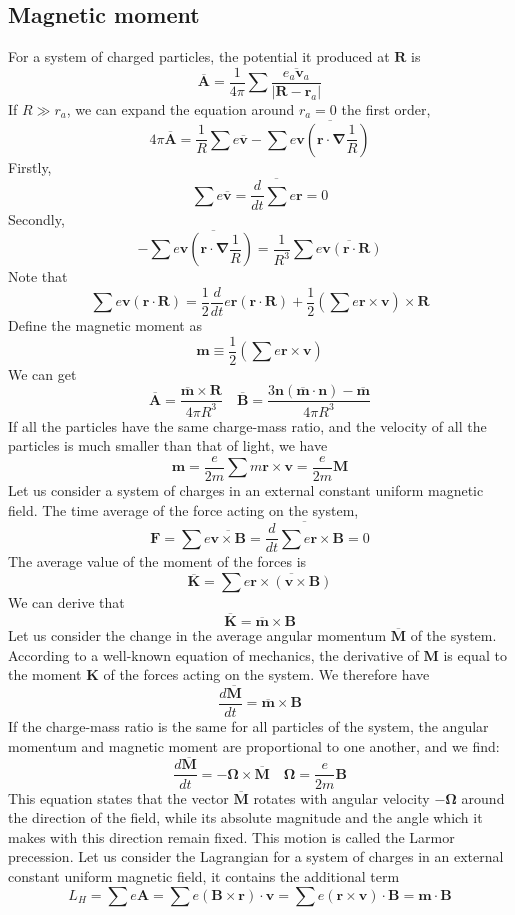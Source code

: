 \documentclass[cyan]{elegantnote}
\begin{document}
\subsection{Magnetic moment}
For a system of charged particles, the potential it produced at $\bm{R}$ is
\[\overline{\bm{A}} = \frac{1}{4\pi} \sum \overline{\frac{e_a \bm{v}_a}{|\bm{R}-\bm{r}_a|}}\]
If $R \gg r_a$, we can expand the equation around $r_a=0$ the first order,
\[4\pi \overline{\bm{A}} = \frac{1}{R} \sum e \overline{\bm{v}} - \sum \overline{e \bm{v} \left( \bm{r} \cdot \bm{\nabla} \frac{1}{R}\right)}\]
Firstly,
\[\sum e \overline{\bm{v}} = \overline{\frac{d}{dt} \sum e \bm{r}} = 0\]
Secondly,
\[-\sum \overline{e \bm{v} \left( \bm{r} \cdot \bm{\nabla} \frac{1}{R}\right)} = \frac{1}{R^3} \sum \overline{e\bm{v} (\bm{r} \cdot \bm{R})}\]
Note that
\[\sum e\bm{v} (\bm{r} \cdot \bm{R}) = \frac{1}{2} \frac{d}{dt} e\bm{r}(\bm{r}\cdot\bm{R}) + \frac{1}{2} \left(\sum e \bm{r} \times \bm{v}\right) \times \bm{R}\]
Define the magnetic moment as
\[\bm{m} \equiv \frac{1}{2} \left(\sum e \bm{r} \times \bm{v}\right)\]
We can get
\[\overline{\bm{A}} = \frac{\overline{\bm{m}} \times \bm{R}}{4\pi R^3} \quad \overline{\bm{B}} = \frac{3\bm{n}(\overline{\bm{m}} \cdot \bm{n})-\overline{\bm{m}}}{4\pi R^3}\]
If all the particles have the same charge-mass ratio, and the velocity of all the particles is much smaller than that of light, we have
\[\bm{m} = \frac{e}{2m} \sum m \bm{r} \times \bm{v} = \frac{e}{2m} \bm{M}\]
Let us consider a system of charges in an external constant uniform magnetic field. The time average of the force acting on the system, 
\[\bm{F} = \sum e \overline{\bm{v} \times \bm{B}} = \overline{\frac{d}{dt} \sum e \bm{r} \times \bm{B}} = 0\]
The average value of the moment of the forces is 
\[\overline{\bm{K}} = \sum e \overline{\bm{r} \times (\bm{v} \times \bm{B})}\]
We can derive that
\[\overline{\bm{K}} = \overline{\bm{m}} \times \bm{B}\]
Let us consider the change in the average angular momentum $\overline{\bm{M}}$ of the system. According to a well-known equation of mechanics, the derivative of $\bm{M}$ is equal to the moment $\bm{K}$ of the forces acting on the system. We therefore have
\[\frac{d \overline{\bm{M}}}{dt} = \overline{\bm{m}} \times \bm{B}\]
If the charge-mass ratio is the same for all particles of the system, the angular momentum and magnetic moment are proportional to one another, and we find:
\[\frac{d \overline{\bm{M}}}{dt} = - \bm{\Omega} \times \overline{\bm{M}} \quad \bm{\Omega} = \frac{e}{2m} \bm{B}\]
This equation states that the vector $\overline{\bm{M}}$ rotates with angular velocity $-\bm{\Omega}$ around the direction of the field, while its absolute magnitude and the angle which it makes with this direction remain fixed. This motion is called the Larmor precession.
Let us consider the Lagrangian for a system of charges in an external constant uniform magnetic field, it contains the additional term
\[L_H = \sum e \bm{A} = \sum e (\bm{B} \times \bm{r}) \cdot \bm{v} = \sum e (\bm{r} \times \bm{v}) \cdot \bm{B} = \bm{m} \cdot \bm{B}\]
\end{document}
